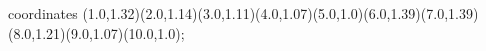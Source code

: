 					coordinates { (1.0,1.32)(2.0,1.14)(3.0,1.11)(4.0,1.07)(5.0,1.0)(6.0,1.39)(7.0,1.39)(8.0,1.21)(9.0,1.07)(10.0,1.0)};